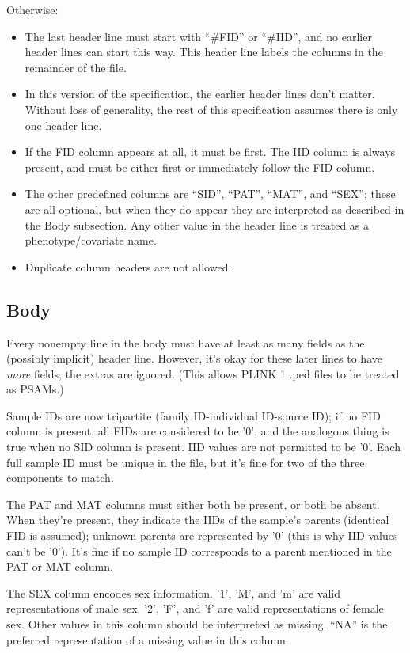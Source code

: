 \documentclass[8pt]{article}
\begin{document}
Otherwise:

\begin{itemize}
\item The last header line must start with ``\#FID'' or ``\#IID'', and no
  earlier header lines can start this way.  This header line labels the columns
  in the remainder of the file.
\item In this version of the specification, the earlier header lines don't
  matter.  Without loss of generality, the rest of this specification assumes
  there is only one header line.
\item If the FID column appears at all, it must be first.  The IID column is
  always present, and must be either first or immediately follow the FID
  column.
\item The other predefined columns are ``SID'', ``PAT'', ``MAT'', and ``SEX'';
  these are all optional, but when they do appear they are interpreted as
  described in the Body subsection.  Any other value in the header line is
  treated as a phenotype/covariate name.
\item Duplicate column headers are not allowed.
\end{itemize}

\subsection{Body}

Every nonempty line in the body must have at least as many fields as the
(possibly implicit) header line.  However, it's okay for these later lines to
have \textit{more} fields; the extras are ignored.  (This allows PLINK 1 .ped
files to be treated as PSAMs.)

Sample IDs are now tripartite (family ID-individual ID-source ID); if no FID
column is present, all FIDs are considered to be '0', and the analogous thing
is true when no SID column is present.  IID values are not permitted to be '0'.
Each full sample ID must be unique in the file, but it's fine for two of the
three components to match.

The PAT and MAT columns must either both be present, or both be absent.  When
they're present, they indicate the IIDs of the sample's parents (identical FID
is assumed); unknown parents are represented by '0' (this is why IID values
can't be '0').  It's fine if no sample ID corresponds to a parent mentioned in
the PAT or MAT column.

The SEX column encodes sex information.  '1', 'M', and 'm' are valid
representations of male sex.  '2', 'F', and 'f' are valid representations of
female sex.  Other values in this column should be interpreted as missing.
``NA'' is the preferred representation of a missing value in this column.
\end{document}
